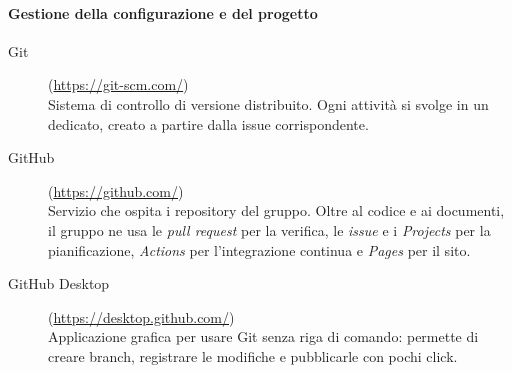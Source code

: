 \documentclass[documento]{gpt}
\begin{document}
	\paragraph{Gestione della configurazione e del progetto}
	\begin{description}
		\item[Git] (\url{https://git-scm.com/}) \hfill \\
		Sistema di controllo di versione distribuito. Ogni attività si svolge
		in un  dedicato, creato a partire dalla issue
		corrispondente.
		\item[GitHub] (\url{https://github.com/}) \hfill \\
		Servizio che ospita i repository del gruppo. Oltre al codice e ai
		documenti, il gruppo ne usa le \textit{pull request} per la verifica,
		le \textit{issue} e i \textit{Projects} per la pianificazione,
		\textit{Actions} per l'integrazione continua e \textit{Pages} per il
		sito.
		\item[GitHub Desktop] (\url{https://desktop.github.com/}) \hfill \\
		Applicazione grafica per usare Git senza riga di comando: permette di
		creare branch, registrare le modifiche e pubblicarle con pochi click.
	\end{description}
	
\end{document}

